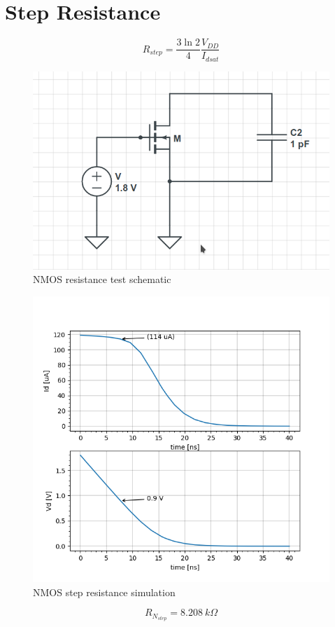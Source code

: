 \section{Step Resistance}

$$ R_{step} = \dfrac{3 \ln{2}}{4} \dfrac{V_{DD}}{I_{dsat}} $$

\begin{figure}[!h]
	\centering
	\includegraphics[width=.4\linewidth]{../img/circ/N_rstep.png}
	\caption{NMOS resistance test schematic}
\end{figure}
%
\begin{figure}[!h]
	\centering
	\includegraphics[width=.7\linewidth]{../img/py/Nrstep.png}
	\caption{NMOS step resistance simulation}
\end{figure}

$$ R_{N_{step}} = 8.208~k \Omega$$

